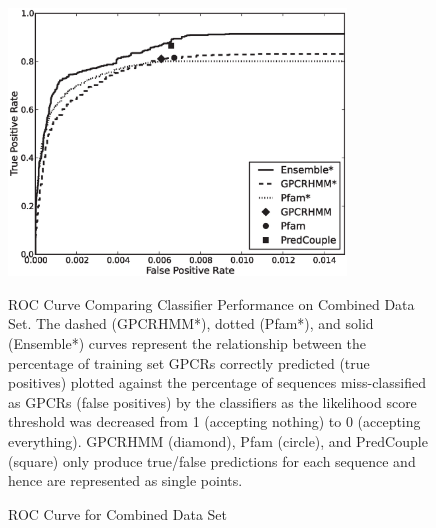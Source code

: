 \begin{figure}[H]
  \centering
  \caption{ROC Curve for Combined Data Set}
  \includegraphics[width=0.8\textwidth]{figures/gpcr_classifier/combined_ensembl_roc.eps}
  
ROC Curve Comparing Classifier Performance on Combined Data Set. The dashed (GPCRHMM*), dotted (Pfam*), and solid (Ensemble*) curves represent the relationship between the percentage of training set GPCRs correctly predicted (true positives) plotted against the percentage of sequences miss-classified as GPCRs (false positives) by the classifiers as the likelihood score threshold was decreased from 1 (accepting nothing) to 0 (accepting everything). GPCRHMM (diamond), Pfam (circle), and PredCouple (square) only produce true/false predictions for each sequence and hence are represented as single points.
\label{fig:combined-roc-curve}
\end{figure}

